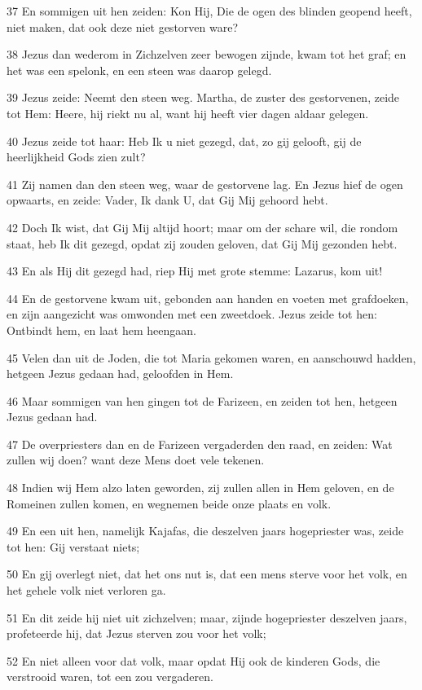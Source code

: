 \par 37 En sommigen uit hen zeiden: Kon Hij, Die de ogen des blinden geopend heeft, niet maken, dat ook deze niet gestorven ware?
\par 38 Jezus dan wederom in Zichzelven zeer bewogen zijnde, kwam tot het graf; en het was een spelonk, en een steen was daarop gelegd.
\par 39 Jezus zeide: Neemt den steen weg. Martha, de zuster des gestorvenen, zeide tot Hem: Heere, hij riekt nu al, want hij heeft vier dagen aldaar gelegen.
\par 40 Jezus zeide tot haar: Heb Ik u niet gezegd, dat, zo gij gelooft, gij de heerlijkheid Gods zien zult?
\par 41 Zij namen dan den steen weg, waar de gestorvene lag. En Jezus hief de ogen opwaarts, en zeide: Vader, Ik dank U, dat Gij Mij gehoord hebt.
\par 42 Doch Ik wist, dat Gij Mij altijd hoort; maar om der schare wil, die rondom staat, heb Ik dit gezegd, opdat zij zouden geloven, dat Gij Mij gezonden hebt.
\par 43 En als Hij dit gezegd had, riep Hij met grote stemme: Lazarus, kom uit!
\par 44 En de gestorvene kwam uit, gebonden aan handen en voeten met grafdoeken, en zijn aangezicht was omwonden met een zweetdoek. Jezus zeide tot hen: Ontbindt hem, en laat hem heengaan.
\par 45 Velen dan uit de Joden, die tot Maria gekomen waren, en aanschouwd hadden, hetgeen Jezus gedaan had, geloofden in Hem.
\par 46 Maar sommigen van hen gingen tot de Farizeen, en zeiden tot hen, hetgeen Jezus gedaan had.
\par 47 De overpriesters dan en de Farizeen vergaderden den raad, en zeiden: Wat zullen wij doen? want deze Mens doet vele tekenen.
\par 48 Indien wij Hem alzo laten geworden, zij zullen allen in Hem geloven, en de Romeinen zullen komen, en wegnemen beide onze plaats en volk.
\par 49 En een uit hen, namelijk Kajafas, die deszelven jaars hogepriester was, zeide tot hen: Gij verstaat niets;
\par 50 En gij overlegt niet, dat het ons nut is, dat een mens sterve voor het volk, en het gehele volk niet verloren ga.
\par 51 En dit zeide hij niet uit zichzelven; maar, zijnde hogepriester deszelven jaars, profeteerde hij, dat Jezus sterven zou voor het volk;
\par 52 En niet alleen voor dat volk, maar opdat Hij ook de kinderen Gods, die verstrooid waren, tot een zou vergaderen.
